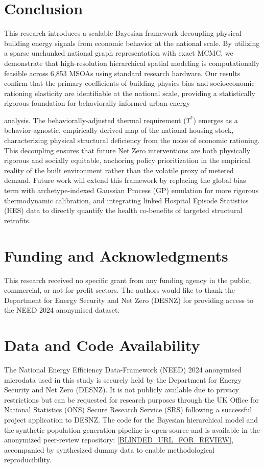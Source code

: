 \documentclass[11pt, a4paper, twocolumn, numbers]{elsarticle}
\begin{document}
\section{Conclusion}\label{conclusion}

This research introduces a scalable Bayesian framework decoupling 
physical building energy signals from economic behavior at the national 
scale. By utilizing a sparse unchunked national graph representation with 
exact MCMC, we demonstrate that high-resolution hierarchical 
spatial modeling is computationally feasible across 6,853 MSOAs using 
standard research hardware. Our results confirm that the primary 
coefficients of building physics bias and socioeconomic rationing 
elasticity are identifiable at the national scale, providing a 
statistically rigorous foundation for behaviorally-informed urban energy 

analysis. The behaviorally-adjusted thermal requirement (\(T^*\)) emerges as a 
behavior-agnostic, empirically-derived map of the national housing stock, 
characterizing physical structural deficiency from the noise of economic 
rationing. This decoupling ensures that future Net Zero interventions 
are both physically rigorous and socially equitable, anchoring policy 
prioritization in the empirical reality of the built environment rather 
than the volatile proxy of metered demand.
 Future work will extend this 
framework by replacing the global bias term with archetype-indexed 
Gaussian Process (GP) emulation for more rigorous thermodynamic 
calibration, and integrating linked Hospital Episode Statistics (HES) 
data to directly quantify the health co-benefits of targeted structural 
retrofits.

\section*{Funding and Acknowledgments}\label{funding-and-acknowledgments}

This research received no specific grant from any funding agency in the public, commercial, or not-for-profit sectors. The authors would like to thank the Department for Energy Security and Net Zero (DESNZ) for providing access to the NEED 2024 anonymised dataset.

\section{Data and Code Availability}\label{data-and-code-availability}

The National Energy Efficiency Data-Framework (NEED) 2024 anonymised
microdata used in this study is securely held by the Department for
Energy Security and Net Zero (DESNZ). It is not publicly available due
to privacy restrictions but can be requested for research purposes
through the UK Office for National Statistics (ONS) Secure Research
Service (SRS) following a successful project application to DESNZ. The
code for the Bayesian hierarchical model and the synthetic population
generation pipeline is open-source and is available in the anonymized peer-review repository: \url{[BLINDED_URL_FOR_REVIEW]}, accompanied by synthesized
dummy data to enable methodological reproducibility.



\end{document}
